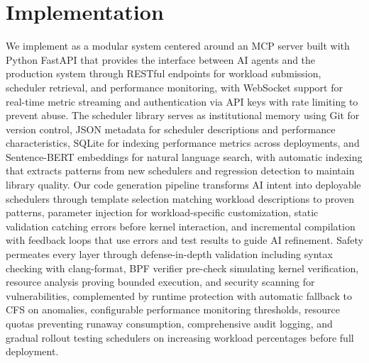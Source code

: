 \section{Implementation}
\label{sec:implementation}

We implement \sys as a modular system centered around an MCP server built with Python FastAPI that provides the interface between AI agents and the production system through RESTful endpoints for workload submission, scheduler retrieval, and performance monitoring, with WebSocket support for real-time metric streaming and authentication via API keys with rate limiting to prevent abuse. The scheduler library serves as institutional memory using Git for version control, JSON metadata for scheduler descriptions and performance characteristics, SQLite for indexing performance metrics across deployments, and Sentence-BERT embeddings for natural language search, with automatic indexing that extracts patterns from new schedulers and regression detection to maintain library quality. Our code generation pipeline transforms AI intent into deployable schedulers through template selection matching workload descriptions to proven patterns, parameter injection for workload-specific customization, static validation catching errors before kernel interaction, and incremental compilation with feedback loops that use errors and test results to guide AI refinement. Safety permeates every layer through defense-in-depth validation including syntax checking with clang-format, BPF verifier pre-check simulating kernel verification, resource analysis proving bounded execution, and security scanning for vulnerabilities, complemented by runtime protection with automatic fallback to CFS on anomalies, configurable performance monitoring thresholds, resource quotas preventing runaway consumption, comprehensive audit logging, and gradual rollout testing schedulers on increasing workload percentages before full deployment.